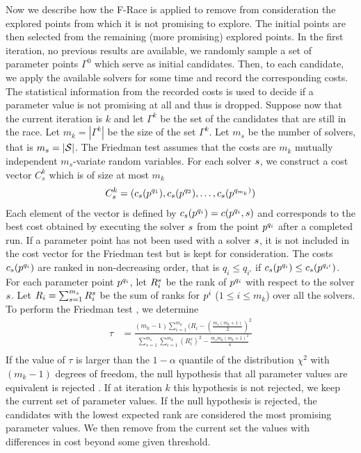 Now we describe how the F-Race is applied to remove from consideration the explored points from which it is not promising to explore. The initial points are then selected from the remaining (more promising) explored points. In the first iteration, no previous results are available, we randomly sample a set of parameter points $\Gamma^0$ which serve as initial candidates. Then, to each candidate, we apply the available solvers for some time and record the corresponding costs. The statistical information from the recorded costs is used to decide if a parameter value is not promising at all and thus is dropped. Suppose now that the current iteration is $k$ and let $\Gamma^k$ be the set of the candidates that are still in the race. Let $m_k = | \Gamma^k | $ be the size of the set $\Gamma^k$. Let $m_s$ be the number of solvers, that is $m_s = | \mathcal{S}|$. The Friedman test assumes that the costs are $m_k$ mutually independent $m_s$-variate random variables. For each solver $s$, we construct a cost vector $C^k_s$ which is of size at most $m_k$
\begin{eqnarray}\label{eq:C}
C^k_s = (c_{s}(p^{q_1}), c_{s}(p^{q_2}), \ldots, c_{s}(p^{q_{m_k})})
\end{eqnarray}
Each element of the vector is defined by $c_{s}(p^{q_i}) = c(p^{q_i}, s)$ and corresponds to the best cost obtained by executing the solver $s$ from the point $p^{q_i}$ after a completed run. If a parameter point has not been used with a solver $s$, it is not included in the cost vector for the Friedman test but is kept for consideration. The costs $c_{s}(p^{q_i})$ are ranked in non-decreasing order, that is $q_i \le q_{i'}$ if $c_{s}(p^{q_i}) \le c_{s}(p^{q_{i'}})$. For each parameter point $p^{q_i}$, let $R^{s}_{i}$ be the rank of $p^{q_i}$ with respect to the solver $s$. Let $R_{i} =  \sum_{s=1}^{m_s} R^{s}_{i}$ be the sum of ranks for $p^i$ ($1 \leq i \leq m_k$) over all the solvers. To perform the Friedman test \cite{FRace2010}, we determine
\begin{eqnarray*}
\tau & = \displaystyle{ \frac{ (m_k-1) \sum_{i=1}^{m_k} (R_i - (\frac{m_s(m_k+1)}{2})^2 } {\sum_{s=1}^{m_s} \sum_{i=1}^{m_k}  (R^s_{i})^2 -  \frac{m_s m_k (m_k+1)^2}{4} }} \nonumber \\ 
\end{eqnarray*}
If the value of $\tau$ is larger than the $1 - \alpha$ quantile of the distribution $\chi^2$  with $(m_k - 1)$ degrees of freedom, the null hypothesis that all parameter values are equivalent is rejected \cite{Papoulis1991}. If at iteration $k$ this hypothesis is not rejected, we keep the current set of parameter values. If the null hypothesis is rejected, the candidates with the lowest expected rank are considered the most promising parameter values. We then remove from the current set  the values with differences in cost beyond some given threshold.  
 
